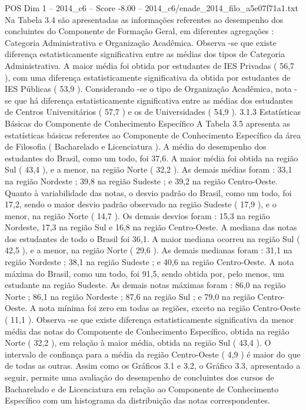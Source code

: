 \begin{textsample}{POS Dim 1 – 2014\_c6 – Score -8.00 – 2014\_c6/enade\_2014\_filo\_a5e07f71a1.txt}
Na Tabela 3.4 são apresentadas as informações referentes ao desempenho dos concluintes do Componente de Formação Geral, em diferentes agregações : Categoria Administrativa e Organização Acadêmica.
Observa -se que existe diferença estatisticamente significativa entre as médias dos tipos de Categoria Administrativa.
A maior média foi obtida por estudantes de IES Privadas ( 56,7 ), com uma diferença estatisticamente significativa da obtida por estudantes de IES Públicas ( 53,9 ).
Considerando -se o tipo de Organização Acadêmica, nota -se que há diferença estatisticamente significativa entre as médias dos estudantes de Centros Universitários ( 57,7 ) e os de Universidades ( 54,9 ). 3.1.3 Estatísticas Básicas do Componente de Conhecimento Específico A Tabela 3.5 apresenta as estatísticas básicas referentes ao Componente de Conhecimento Específico da área de Filosofia ( Bacharelado e Licenciatura ).
A média do desempenho dos estudantes do Brasil, como um todo, foi 37,6.
A maior média foi obtida na região Sul ( 43,4 ), e a menor, na região Norte ( 32,2 ).
As demais médias foram : 33,1 na região Nordeste ; 39,8 na região Sudeste ; e 39,2 na região Centro-Oeste.
Quanto à variabilidade das notas, o desvio padrão do Brasil, como um todo, foi 17,2, sendo o maior desvio padrão observado na região Sudeste ( 17,9 ), e o menor, na região Norte ( 14,7 ).
Os demais desvios foram : 15,3 na região Nordeste, 17,3 na região Sul e 16,8 na região Centro-Oeste.
A mediana das notas dos estudantes de todo o Brasil foi 36,1.
A maior mediana ocorreu na região Sul ( 42,5 ), e a menor, na região Norte ( 29,6 ).
As demais medianas foram : 31,1 na região Nordeste ; 38,1 na região Sudeste ; e 40,6 na região Centro-Oeste.
A nota máxima do Brasil, como um todo, foi 91,5, sendo obtida por, pelo menos, um estudante na região Sudeste.
As demais notas máximas foram : 86,0 na região Norte ; 86,1 na região Nordeste ; 87,6 na região Sul ; e 79,0 na região Centro-Oeste.
A nota mínima foi zero em todas as regiões, exceto na região Centro-Oeste ( 11,1 ).
Observa -se que existe diferença estatisticamente significativa da menor média das notas do Componente de Conhecimento Específico, obtida na região Norte ( 32,2 ), em relação à maior média, obtida na região Sul ( 43,4 ).
O intervalo de confiança para a média da região Centro-Oeste ( 4,9 ) é maior do que de todas as outras.
Assim como os Gráficos 3.1 e 3.2, o Gráfico 3.3, apresentado a seguir, permite uma avaliação do desempenho de concluintes dos cursos de Bacharelado e de Licenciatura em relação ao Componente de Conhecimento Específico com um histograma da distribuição das notas correspondentes.

\end{textsample}
